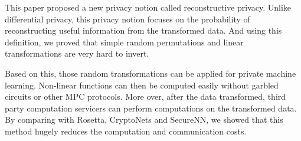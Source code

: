 This paper proposed a new privacy notion called reconstructive privacy. Unlike differential privacy, this privacy notion focuses on the probability of reconstructing useful information from the transformed data. And using this definition, we proved that simple random permutations and linear transformations are very hard to invert.

Based on this, those random transformations can be applied for private machine learning. Non-linear functions can then be computed easily without garbled circuits or other MPC protocols. More over, after the data transformed, third party computation servicers can perform computations on the transformed data. By comparing with Rosetta, CryptoNets and SecureNN, we showed that this method hugely reduces the computation and communication costs. 